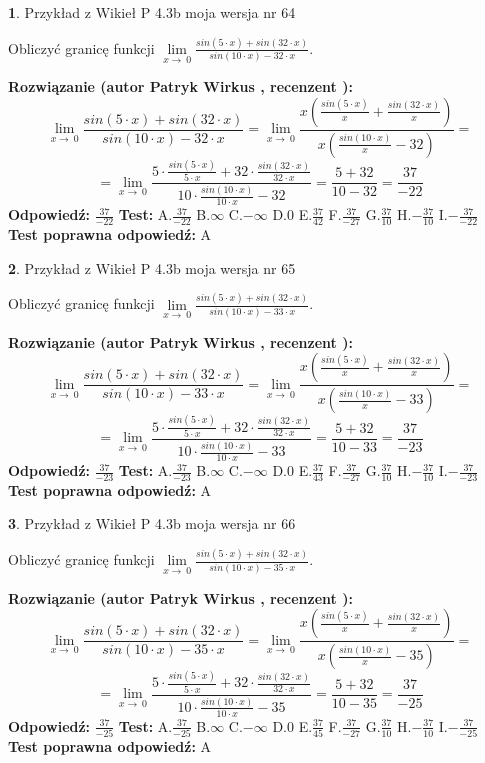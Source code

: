 \documentclass[12pt, a4paper]{article}
\theoremstyle{definition} %
\newtheorem{zad}{}
\newcommand{\zadStart}[1]{\begin{zad}#1\newline}
\newcommand{\zadStop}{\end{zad}}
\newcommand{\rozwStart}[2]{\noindent \textbf{Rozwiązanie (autor #1 , recenzent #2): }\newline}
\newcommand{\rozwStop}{\newline}
\newcommand{\odpStart}{\noindent \textbf{Odpowiedź:}\newline}
\newcommand{\odpStop}{\newline}
\newcommand{\testStart}{\noindent \textbf{Test:}\newline}
\newcommand{\testStop}{\newline}
\newcommand{\kluczStart}{\noindent \textbf{Test poprawna odpowiedź:}\newline}
\newcommand{\kluczStop}{\newline}
\begin{document}
\zadStart{Przykład z Wikieł P 4.3b moja wersja nr 64}


Obliczyć granicę funkcji $\lim\limits_{x\to\ 0}\frac{sin(5 \cdot x)+sin(32 \cdot x)}{sin(10 \cdot x)-32 \cdot x}$.
\zadStop
\rozwStart{Patryk Wirkus}{}
$$\lim\limits_{x\to\ 0}\frac{sin(5 \cdot x)+sin(32 \cdot x)}{sin(10 \cdot x)-32 \cdot x}=\lim\limits_{x\to\ 0}\frac{x(\frac{sin(5 \cdot x)}{x}+\frac{sin(32 \cdot x)}{x})}{x(\frac{sin(10 \cdot x)}{x}-32)}=$$
$$=\lim\limits_{x\to\ 0}\frac{5 \cdot \frac{sin(5 \cdot x)}{5 \cdot x}+32 \cdot \frac{sin(32 \cdot x)}{32 \cdot x}}{10 \cdot \frac{sin(10 \cdot x)}{10 \cdot x}-32}=\frac{5+32}{10-32} = \frac{37}{-22}$$
\rozwStop
\odpStart
$\frac{37}{-22}$
\odpStop
\testStart
A.$\frac{37}{-22}$
B.$\infty$
C.$-\infty$
D.$0$
E.$\frac{37}{42}$
F.$\frac{37}{-27}$
G.$\frac{37}{10}$
H.$-\frac{37}{10}$
I.$-\frac{37}{-22}$
\testStop
\kluczStart
A
\kluczStop



\zadStart{Przykład z Wikieł P 4.3b moja wersja nr 65}


Obliczyć granicę funkcji $\lim\limits_{x\to\ 0}\frac{sin(5 \cdot x)+sin(32 \cdot x)}{sin(10 \cdot x)-33 \cdot x}$.
\zadStop
\rozwStart{Patryk Wirkus}{}
$$\lim\limits_{x\to\ 0}\frac{sin(5 \cdot x)+sin(32 \cdot x)}{sin(10 \cdot x)-33 \cdot x}=\lim\limits_{x\to\ 0}\frac{x(\frac{sin(5 \cdot x)}{x}+\frac{sin(32 \cdot x)}{x})}{x(\frac{sin(10 \cdot x)}{x}-33)}=$$
$$=\lim\limits_{x\to\ 0}\frac{5 \cdot \frac{sin(5 \cdot x)}{5 \cdot x}+32 \cdot \frac{sin(32 \cdot x)}{32 \cdot x}}{10 \cdot \frac{sin(10 \cdot x)}{10 \cdot x}-33}=\frac{5+32}{10-33} = \frac{37}{-23}$$
\rozwStop
\odpStart
$\frac{37}{-23}$
\odpStop
\testStart
A.$\frac{37}{-23}$
B.$\infty$
C.$-\infty$
D.$0$
E.$\frac{37}{43}$
F.$\frac{37}{-27}$
G.$\frac{37}{10}$
H.$-\frac{37}{10}$
I.$-\frac{37}{-23}$
\testStop
\kluczStart
A
\kluczStop



\zadStart{Przykład z Wikieł P 4.3b moja wersja nr 66}


Obliczyć granicę funkcji $\lim\limits_{x\to\ 0}\frac{sin(5 \cdot x)+sin(32 \cdot x)}{sin(10 \cdot x)-35 \cdot x}$.
\zadStop
\rozwStart{Patryk Wirkus}{}
$$\lim\limits_{x\to\ 0}\frac{sin(5 \cdot x)+sin(32 \cdot x)}{sin(10 \cdot x)-35 \cdot x}=\lim\limits_{x\to\ 0}\frac{x(\frac{sin(5 \cdot x)}{x}+\frac{sin(32 \cdot x)}{x})}{x(\frac{sin(10 \cdot x)}{x}-35)}=$$
$$=\lim\limits_{x\to\ 0}\frac{5 \cdot \frac{sin(5 \cdot x)}{5 \cdot x}+32 \cdot \frac{sin(32 \cdot x)}{32 \cdot x}}{10 \cdot \frac{sin(10 \cdot x)}{10 \cdot x}-35}=\frac{5+32}{10-35} = \frac{37}{-25}$$
\rozwStop
\odpStart
$\frac{37}{-25}$
\odpStop
\testStart
A.$\frac{37}{-25}$
B.$\infty$
C.$-\infty$
D.$0$
E.$\frac{37}{45}$
F.$\frac{37}{-27}$
G.$\frac{37}{10}$
H.$-\frac{37}{10}$
I.$-\frac{37}{-25}$
\testStop
\kluczStart
A
\kluczStop
\end{document}
